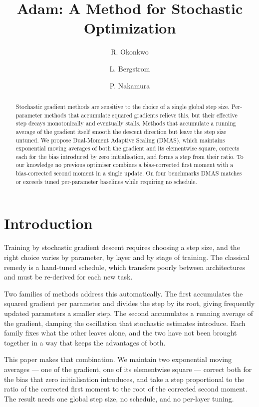 \documentclass{article}
\title{Adam: A Method for Stochastic Optimization}
\author{R. Okonkwo \and L. Bergstrom \and P. Nakamura}
\date{}
\begin{document}
\maketitle

\begin{abstract}
Stochastic gradient methods are sensitive to the choice of a single global
step size. Per-parameter methods that accumulate squared gradients relieve
this, but their effective step decays monotonically and eventually stalls.
Methods that accumulate a running average of the gradient itself smooth the
descent direction but leave the step size untuned. We propose Dual-Moment
Adaptive Scaling (DMAS), which maintains exponential moving averages of both
the gradient and its elementwise square, corrects each for the bias introduced
by zero initialisation, and forms a step from their ratio. To our knowledge no
previous optimiser combines a bias-corrected first moment with a
bias-corrected second moment in a single update. On four benchmarks DMAS
matches or exceeds tuned per-parameter baselines while requiring no schedule.
\end{abstract}

\section{Introduction}

Training by stochastic gradient descent requires choosing a step size, and the
right choice varies by parameter, by layer and by stage of training. The
classical remedy is a hand-tuned schedule, which transfers poorly between
architectures and must be re-derived for each new task.

Two families of methods address this automatically. The first accumulates the
squared gradient per parameter and divides the step by its root, giving
frequently updated parameters a smaller step. The second accumulates a running
average of the gradient, damping the oscillation that stochastic estimates
introduce. Each family fixes what the other leaves alone, and the two have not
been brought together in a way that keeps the advantages of both.

This paper makes that combination. We maintain two exponential moving
averages --- one of the gradient, one of its elementwise square --- correct
both for the bias that zero initialisation introduces, and take a step
proportional to the ratio of the corrected first moment to the root of the
corrected second moment. The result needs one global step size, no schedule,
and no per-layer tuning.
\end{document}
